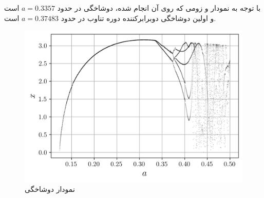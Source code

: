 \documentclass[12pt,a4paper]{article}
\begin{document}
	با توجه به نمودار و زومی که روی آن انجام شده، دوشاخگی  در حدود
	$a=0.3357$
	است و اولین دوشاخگی دوبرابرکننده دوره تناوب در حدود
	$a=0.37483$
	است.
	\begin{figure}[h!]
		\centering
		\includegraphics[width=\linewidth]{fig/12.3.1.bifurcation}
		\caption{نمودار دوشاخگی}
	\end{figure}
\end{document}
